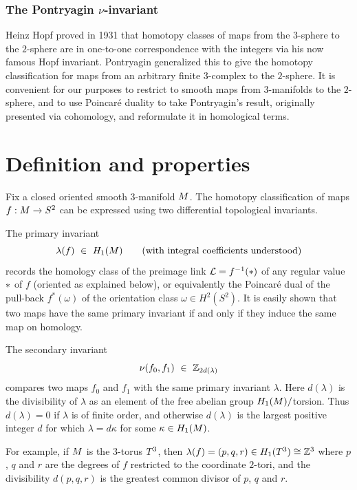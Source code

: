 
\section{The Pontryagin $\nu$-invariant} 
\label{sec:pontryagin}

Heinz Hopf proved in 1931 that homotopy classes of maps from the $3$-sphere to the $2$-sphere are in one-to-one correspondence with the integers via his now famous Hopf invariant.  Pontryagin \cite{Pontryagin41} generalized this to give the homotopy classification for maps from an arbitrary finite $3$-complex to the $2$-sphere.  It is convenient for our purposes to restrict to smooth maps from $3$-manifolds to the $2$-sphere,  and to use Poincar\'e duality to take Pontryagin's result, originally presented via cohomology, and reformulate it in homological terms.

 
\part{Definition and properties}

Fix a closed oriented smooth $3$-manifold $M$.  The homotopy classification of maps $f: M\to S^2$  can be expressed using two differential topological invariants.  

The primary invariant
$$
\lambda(f) \ \in \ H_1(\man) \qquad\text{(with integral coefficients understood)}
$$
records the homology class of the preimage link $\mathcal L = f^{-1}(*)$
of any regular value $\mathrm{*}$ of $f$ (oriented as explained below), or equivalently the Poincar\'e dual of the pull-back $f^*(\omega)$ of the orientation class $\omega\in H^2(S^2)$.  It is easily shown that two maps have the same primary invariant if and only if they induce the same map on homology.     

The secondary invariant 
$$
\nu(f_0,f_1) \ \in \ \bz_{2d(\lambda)}
$$ 
compares two maps $f_0$ and $f_1$ with the same primary invariant $\lambda$.  Here $d(\lambda)$ is the divisibility of $\lambda$ as an element of the free abelian group $H_1(M)/$torsion.  Thus $d(\lambda) = 0$ if $\lambda$ is of finite order, and otherwise $d(\lambda)$ is the largest positive integer $d$ for which $\lambda = d\kappa$ for some $\kappa\in H_1(M)$.   

For example, if $M$ is the $3$-torus $T^3$, then 
$
\lambda(f) = (p,q,r) \in H_1(T^3) \cong \mathbb Z^3
$
where $p$, $q$ and $r$ are the degrees of $f$ restricted to the coordinate $2$-tori, and the divisibility $d(p,q,r)$ is the greatest common divisor of $p$, $q$ and $r$. 

